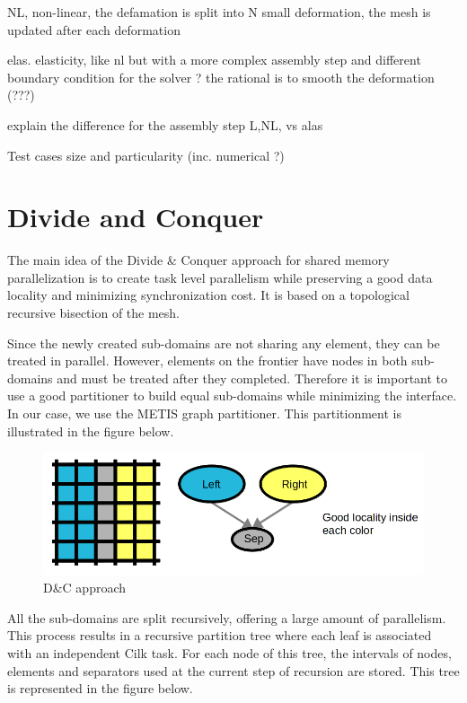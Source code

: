 \documentclass{IOS-Book-Article}
\begin{document}
NL, non-linear, the defamation is split into N small deformation, the mesh is updated after each deformation

elas. elasticity, like nl but with a more complex assembly step and different boundary condition for the solver ? the rational is to smooth the deformation (???)


explain the difference for the assembly step L,NL, vs alas

Test cases size and particularity (inc. numerical ?)



\section{Divide and Conquer}

The main idea of the Divide \& Conquer approach for shared memory parallelization is to create task level parallelism while preserving a good data locality and
minimizing synchronization cost. It is based on a topological recursive bisection of the mesh.

Since the newly created sub-domains are not sharing any element, they can be treated in parallel.
However, elements on the frontier have nodes in both sub-domains and must be treated after they completed.
Therefore it is important to use a good partitioner to build equal sub-domains while minimizing the interface. In our case, we use the METIS graph partitioner.
This partitionment is illustrated in the figure below.
\begin{figure}[htp]
 \centering
 \label{fig2}
 \includegraphics[scale=0.25]{DC_approach.png}
 \caption{D\&C approach}
\end{figure}
All the sub-domains are split recursively, offering a large amount of parallelism.
This process results in a recursive partition tree where each leaf is associated with an independent Cilk task.
For each node of this tree, the intervals of nodes, elements and separators used at the current step of recursion are stored.
This tree is represented in the figure below.
\end{document}
